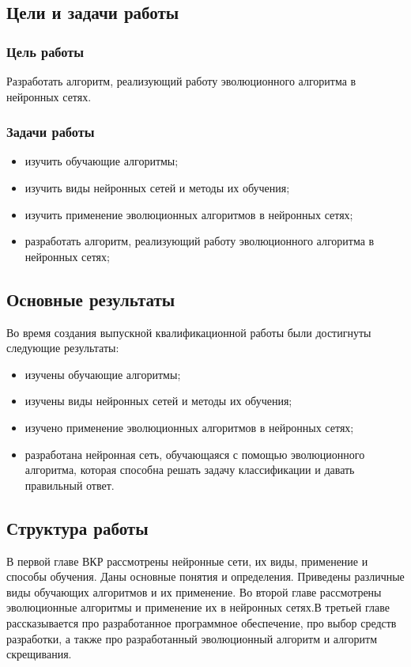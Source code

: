 \subsection*{Цели и задачи работы}
\subsubsection*{Цель работы}

\indent\indent  Разработать алгоритм, реализующий работу эволюционного алгоритма в нейронных сетях.

\subsubsection*{Задачи работы}
\begin{itemize}
	\item изучить обучающие алгоритмы;
	\item изучить виды нейронных сетей и методы их обучения;
	\item изучить применение эволюционных алгоритмов в нейронных сетях;
	\item разработать алгоритм, реализующий работу эволюционного 
  алгоритма в нейронных сетях;
\end{itemize}


\subsection*{Основные результаты}

\indent \indent Во время создания выпускной квалификационной работы были достигнуты следующие результаты:
\begin{itemize}
	\item изучены обучающие алгоритмы;
	\item изучены виды нейронных сетей и методы их обучения;
	\item изучено применение эволюционных алгоритмов в нейронных сетях;
	\item разработана нейронная сеть, обучающаяся с помощью эволюционного алгоритма, которая способна решать задачу классификации и давать правильный ответ.
\end{itemize}

\subsection*{Структура работы}

\indent \indent В первой главе ВКР рассмотрены нейронные сети, их виды, применение и способы обучения. Даны основные понятия и определения. Приведены различные виды обучающих алгоритмов и их применение. Во второй главе рассмотрены эволюционные алгоритмы и применение их в нейронных сетях.В третьей главе рассказывается про разработанное программное обеспечение, про выбор средств разработки, а также про разработанный эволюционный алгоритм и алгоритм скрещивания.
